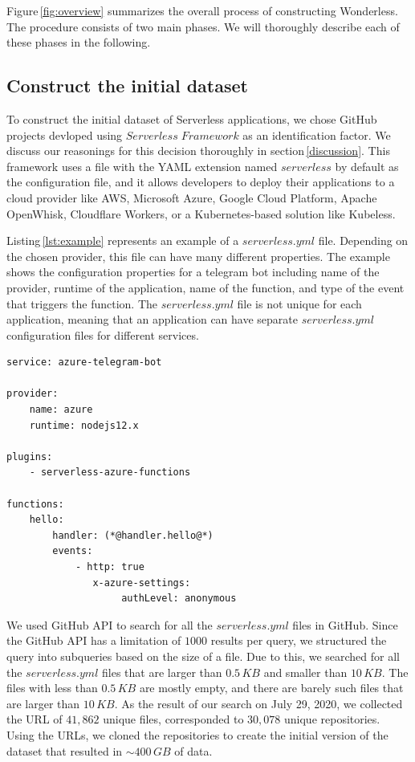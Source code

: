 Figure\,\ref{fig:overview} summarizes the overall process of constructing Wonderless. 
The procedure consists of two main phases. 
We will thoroughly describe each of these phases in the following.

\subsection{Construct the initial dataset} \label{phaseA}

To construct the initial dataset of Serverless applications, we chose GitHub projects 
devloped using $Serverless \; Framework$ as an identification factor. 
We discuss our reasonings for this decision thoroughly in section\,\ref{discussion}.
This framework uses a file with the YAML extension named $serverless$ 
by default as the configuration file, and it allows developers to deploy their 
applications to a cloud provider like AWS, Microsoft Azure, Google Cloud 
Platform, Apache OpenWhisk, Cloudflare Workers, or a Kubernetes-based 
solution like Kubeless.

Listing\,\ref{lst:example} represents an example of a $serverless.yml$ file. 
Depending on the chosen provider, this file can have many different properties.
The example shows the configuration properties for a telegram bot including 
name of the provider, runtime of the application, name of the function, 
and type of the event that triggers the function. The $serverless.yml$ file is 
not unique for each application, meaning that an application can have separate
$serverless.yml$ configuration files for different services.

\vspace{1mm}

\begin{lstlisting}[frame=single, caption=An example of a serverless.yml file., label={lst:example}, captionpos=b]
service: azure-telegram-bot 

provider:  
	name: azure
	runtime: nodejs12.x  
	
plugins:  
	- serverless-azure-functions 

functions:
	hello:    
		handler: (*@handler.hello@*)
		events:   
			- http: true        
			   x-azure-settings:          
			   		authLevel: anonymous
\end{lstlisting}


We used GitHub API to search for all the $serverless.yml$ files in GitHub. 
Since the GitHub API has a limitation of $1000$ results per query, we structured 
the query into subqueries based on the size of a file. 
Due to this, we searched for all the $serverless.yml$ files that are larger 
than $0.5\,KB$ and smaller than $10\,KB$. The files with less than 
$0.5\,KB$ are mostly empty, and there are barely such files that are 
larger than $10\,KB$. As the result of our search on July 29, 2020, 
we collected the URL of $41,862$ unique files, corresponded to 
$30,078$ unique repositories. Using the URLs, we cloned 
the repositories to create the initial version of the dataset that 
resulted in $\sim 400 \, GB$ of data.

